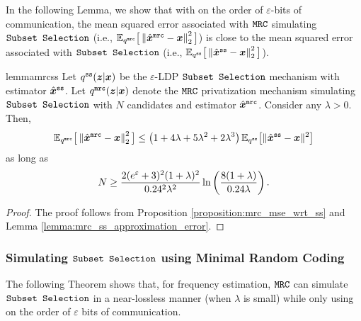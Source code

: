 In the following Lemma, we show that with on the order of $\varepsilon$-bits of communication, the mean squared error associated with $\texttt{MRC}$ simulating $\texttt{Subset Selection}$ (i.e., $\mathbb{E}_{q^{\texttt{mrc}}} \big[ \left\lVert  \hat{{\boldsymbol{x}}}^\texttt{mrc} - {\boldsymbol{x}} \right\rVert^2_2  \big]$) is close to the mean squared error associated with $\texttt{Subset Selection}$ (i.e., $\mathbb{E}_{q^{\texttt{ss}}} \big[ \left\lVert  \hat{{\boldsymbol{x}}}^\texttt{ss} - {\boldsymbol{x}} \right\rVert^2_2  \big]$).
\begin{restatable}{lemma}{mrcss}\label{theorem:mrc_ss}
Let $q^{\texttt{ss}}({\boldsymbol{z}} | {\boldsymbol{x}})$ be the  $\varepsilon$-LDP \emph{$\texttt{Subset Selection}$} mechanism with estimator $\hat{{\boldsymbol{x}}}^{\texttt{ss}}$. Let $q^{\texttt{mrc}}({\boldsymbol{z}}|{\boldsymbol{x}})$ denote the \emph{$\texttt{MRC}$} privatization mechanism simulating \emph{$\texttt{Subset Selection}$} with $N$ candidates and estimator $\hat{{\boldsymbol{x}}}^{\texttt{mrc}}$. 
Consider any $\lambda > 0$. Then,
\begin{align}
   \mathbb{E}_{q^{\texttt{mrc}}} \big[ \left\lVert  \hat{{\boldsymbol{x}}}^\texttt{mrc} - {\boldsymbol{x}} \right\rVert^2_2  \big]  \leq  \left( 1+4\lambda +5\lambda^2 + 2\lambda^3 \right)  \mathbb{E}_{q^{\texttt{ss}}}\big[\|\hat{{\boldsymbol{x}}}^{\texttt{ss}} - {\boldsymbol{x}}\|^2\big]
\end{align}
as long as 
\begin{align}
    N \geq  \frac{2(e^{\varepsilon}+3)^2(1+\lambda)^2}{0.24^2\lambda^2}\ln\left( \frac{8(1+\lambda)}{0.24\lambda}\right).
\end{align}
\end{restatable}
\begin{proof}
The proof follows from Proposition \ref{proposition:mrc_mse_wrt_ss} and Lemma \ref{lemma:mrc_ss_approximation_error}.
\end{proof}

\subsubsection{Simulating \texorpdfstring{$\texttt{Subset Selection}$}{Subset Selection} using Minimal Random Coding}\label{appendix:mrc_ss_utility}
The following Theorem shows that, for frequency estimation, $\texttt{MRC}$ can simulate $\texttt{Subset Selection}$ in a near-lossless manner (when $\lambda$ is small) while only using on the order of $\varepsilon$ bits of communication.


